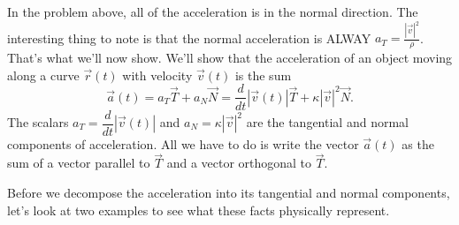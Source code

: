 In the problem above, all of the acceleration is in the normal direction. The interesting thing to note is that the normal acceleration is ALWAY $a_T =  \frac{|\vec v|^2}{\rho}$.  That's what we'll now show.
We'll show that the acceleration of an object moving along a curve $\vec r(t)$ with velocity $\vec v(t)$ is the sum
$$\vec a(t) = a_T\vec T+a_N\vec N=\frac{d}{dt}|\vec v(t)| \vec T + \kappa |\vec v|^2 \vec N.$$
The scalars $a_T=\dfrac{d}{dt}|\vec v(t)|$ and $a_N=\kappa |\vec v|^2$ 
are the tangential and normal components of acceleration.  All we have to do is write the vector $\vec a(t)$ as the sum of a vector parallel to $\vec T$ and a vector orthogonal to $\vec T$. 

Before we decompose the acceleration into its tangential and normal components, let's look at two examples to see what these facts physically represent.



% 

